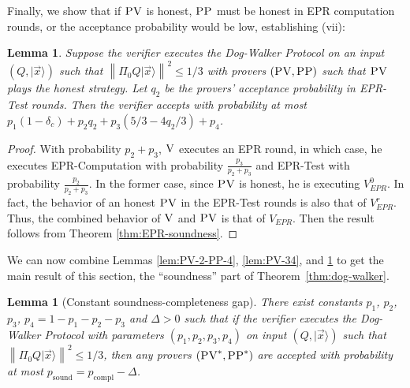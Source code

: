 \documentclass[11pt,letter]{article}
\newtheorem{lemma}[theorem]{Lemma}
\theoremstyle{remark}
\theoremstyle{definition}
\newcommand{\ket}[1]{|#1\rangle}
\newcommand{\ver}{\textsc{V}}
\newcommand{\pv}{\textsc{PV}}
\newcommand{\pp}{\textsc{PP}}
\newcommand{\norm}[1]{\left\|#1\right\|}
\begin{document}
Finally, we show that if $\pv$ is honest, $\pp$ must be honest in EPR computation rounds, or the acceptance probability would be low, establishing (vii):
\begin{lemma}\label{lem:PP-3}
Suppose the verifier executes the Dog-Walker Protocol on an input $(Q,\ket{\vec{x}})$ such that $\norm{\Pi_0 Q\ket{\vec{x}}}^2\leq 1/3$ with provers $(\pv,\pp)$ such that $\pv$ plays the honest strategy. Let $q_2$ be the provers' acceptance probability in EPR-Test rounds. Then the verifier accepts with probability at most
  $p_1(1-\delta_c) +p_2q_2+p_3(5/3-4q_2/3)+p_4$. 
\end{lemma}
\begin{proof}
With probability $p_2+p_3$, $\ver$ executes an EPR round, in which case, he executes EPR-Computation with probability $\frac{p_3}{p_2+p_3}$ and EPR-Test with probability $\frac{p_2}{p_2+p_3}$. In the former case, since $\pv$ is honest, he is executing $V_{EPR}^0$. In fact, the behavior of an honest $\pv$ in the EPR-Test rounds is also that of $V_{EPR}^r$. Thus, the combined behavior of $\ver$ and $\pv$ is that of $V_{EPR}$. Then the result follows from Theorem \ref{thm:EPR-soundness}. 
\end{proof}

We can now combine Lemmas \ref{lem:PV-2-PP-4}, \ref{lem:PV-34}, and \ref{lem:PP-3} to get the main result of this section, the ``soundness'' part of Theorem~\ref{thm:dog-walker}.

\begin{lemma}[Constant soundness-completeness gap]\label{lem:dogwalker-soundness}
 There exist constants $p_1$, $p_2$, $p_3$, $p_4=1-p_1-p_2-p_3$ and $\Delta>0$ such that if the verifier executes the Dog-Walker Protocol with parameters $(p_1,p_2,p_3,p_4)$ on input $(Q,\ket{\vec{x}})$ such that $\norm{\Pi_0 Q\ket{\vec{x}}}^2\leq 1/3$, then any provers $(\pv^*,\pp^*)$ are accepted with probability at most $p_{\mathrm{sound}}=p_{\mathrm{compl}}-\Delta$. 
\end{lemma}
\end{document}
